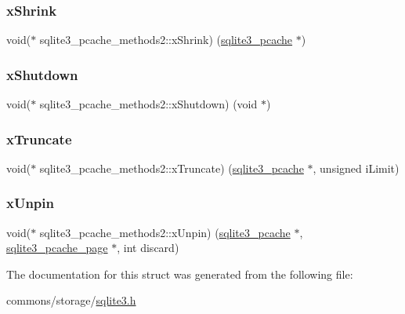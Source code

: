 \mbox{\label{structsqlite3__pcache__methods2_a225971a193ff429d9f1339aca39c7755}} 
\subsubsection{\texorpdfstring{xShrink}{xShrink}}
{\footnotesize\ttfamily void($\ast$ sqlite3\+\_\+pcache\+\_\+methods2\+::x\+Shrink) (\mbox{\hyperlink{sqlite3_8h_a096c453d937d51f7926d7d31c8e0bd2f}{sqlite3\+\_\+pcache}} $\ast$)}

\mbox{\label{structsqlite3__pcache__methods2_a4285fc03adf01cbd3283644a1072ffef}} 
\subsubsection{\texorpdfstring{xShutdown}{xShutdown}}
{\footnotesize\ttfamily void($\ast$ sqlite3\+\_\+pcache\+\_\+methods2\+::x\+Shutdown) (void $\ast$)}

\mbox{\label{structsqlite3__pcache__methods2_a711d60b1895622a10186a2894cef1383}} 
\subsubsection{\texorpdfstring{xTruncate}{xTruncate}}
{\footnotesize\ttfamily void($\ast$ sqlite3\+\_\+pcache\+\_\+methods2\+::x\+Truncate) (\mbox{\hyperlink{sqlite3_8h_a096c453d937d51f7926d7d31c8e0bd2f}{sqlite3\+\_\+pcache}} $\ast$, unsigned i\+Limit)}

\mbox{\label{structsqlite3__pcache__methods2_a8fcb4ba48106aac8dfff247baea06e1a}} 
\subsubsection{\texorpdfstring{xUnpin}{xUnpin}}
{\footnotesize\ttfamily void($\ast$ sqlite3\+\_\+pcache\+\_\+methods2\+::x\+Unpin) (\mbox{\hyperlink{sqlite3_8h_a096c453d937d51f7926d7d31c8e0bd2f}{sqlite3\+\_\+pcache}} $\ast$, \mbox{\hyperlink{structsqlite3__pcache__page}{sqlite3\+\_\+pcache\+\_\+page}} $\ast$, int discard)}



The documentation for this struct was generated from the following file\+:\begin{DoxyCompactItemize}
\item 
commons/storage/\mbox{\hyperlink{sqlite3_8h}{sqlite3.\+h}}\end{DoxyCompactItemize}
